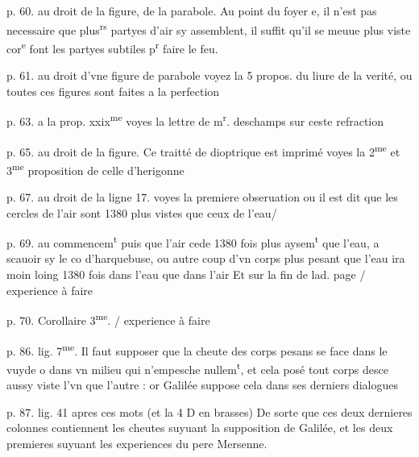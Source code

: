 \documentclass[11pt,a4paper]{article}
\begin{document}
p. 60. au droit de la figure, de la parabole.
Au point du foyer e, il n'est pas necessaire que plus\textsuperscript{rs} partyes d'air sy assemblent, il suffit qu'il se meuue plus viste cor\textsuperscript{e} font les partyes subtiles p\textsuperscript{r} faire le feu.

p. 61. au droit d'vne figure de parabole
voyez la 5 propos. du liure de la verité, ou toutes ces figures sont faites a la perfection

p. 63. a la prop. xxix\textsuperscript{me}
voyes la lettre de m\textsuperscript{r}. deschamps sur ceste refraction

p. 65. au droit de la figure.
Ce traitté de dioptrique est imprimé voyes la 2\textsuperscript{me} et 3\textsuperscript{me} proposition de celle d'herigonne

p. 67. au droit de la ligne 17.
voyes la premiere obseruation ou il est dit que les cercles de l'air sont 1380 plus vistes que ceux de l'eau/


p. 69. au commencem\textsuperscript{t}
puis que l'air cede 1380 fois plus aysem\textsuperscript{t} que l'eau, a scauoir sy le co d'harquebuse, ou autre coup d'vn corps plus pesant que l'eau ira moin loing \struck{\ill{}} 1380 fois dans l'eau que dans l'air
Et sur la fin de lad. page / experience à faire

p. 70. Corollaire 3\textsuperscript{me}. / experience à faire


p. 86. lig. 7\textsuperscript{me}.
Il faut supposer que la cheute des corps pesans se face dans le vuyde o dans vn milieu qui n'empesche nullem\textsuperscript{t}, et cela posé tout corps desce\ill{} aussy viste l'vn que l'autre : or Galilée suppose cela dans ses derniers dialogues

p. 87. lig. 41 apres ces mots (et la 4 D en brasses)
De sorte que ces deux dernieres colonnes contiennent les cheutes suyuant la supposition de Galilée, et les deux premieres suyuant les experiences du pere Mersenne.
\end{document}
